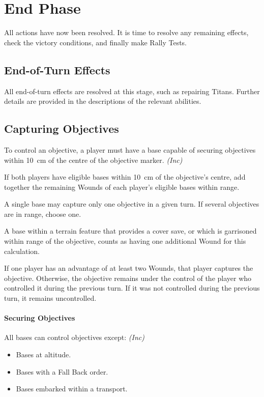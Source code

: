 \section{End Phase}

All actions have now been resolved. It is time to resolve any remaining effects, check the victory conditions, and finally make Rally Tests.

\subsection{End-of-Turn Effects}

All end-of-turn effects are resolved at this stage, such as repairing Titans. Further details are provided in the descriptions of the relevant abilities.

\subsection{Capturing Objectives}

To control an objective, a player must have a base capable of securing objectives within 10~cm of the centre of the objective marker. \textit{(Inc)}

If both players have eligible bases within 10~cm of the objective's centre, add together the remaining Wounds of each player's eligible bases within range.

A single base may capture only one objective in a given turn. If several objectives are in range, choose one.

A base within a terrain feature that provides a cover save, or which is garrisoned within range of the objective, counts as having one additional Wound for this calculation.

If one player has an advantage of at least two Wounds, that player captures the objective. Otherwise, the objective remains under the control of the player who controlled it during the previous turn. If it was not controlled during the previous turn, it remains uncontrolled.

\paragraph{Securing Objectives}

All bases can control objectives except: \textit{(Inc)}

\begin{itemize}
    \item Bases at altitude.
    \item Bases with a Fall Back order.
    \item Bases embarked within a transport.
\end{itemize}

